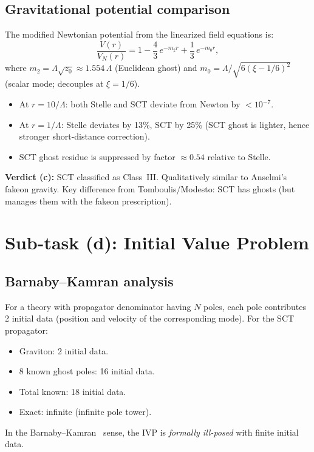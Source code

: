 \documentclass[11pt,a4paper]{article}
\newcommand{\Lam}{\Lambda}
\begin{document}
\subsection{Gravitational potential comparison}

The modified Newtonian potential from the linearized field equations is:
\begin{equation}\label{eq:potential}
  \frac{V(r)}{V_N(r)} = 1 - \frac{4}{3}\,e^{-m_2 r} + \frac{1}{3}\,e^{-m_0 r},
\end{equation}
where $m_2 = \Lam\sqrt{z_0} \approx 1.554\,\Lam$ (Euclidean ghost) and
$m_0 = \Lam/\sqrt{6(\xi-1/6)^2}$ (scalar mode; decouples at $\xi = 1/6$).

\begin{itemize}[nosep]
  \item At $r = 10/\Lam$: both Stelle and SCT deviate from Newton by $< 10^{-7}$.
  \item At $r = 1/\Lam$: Stelle deviates by 13\%, SCT by 25\%
    (SCT ghost is lighter, hence stronger short-distance correction).
  \item SCT ghost residue is suppressed by factor $\approx 0.54$ relative to Stelle.
\end{itemize}

\textbf{Verdict (c):} SCT classified as Class~III. Qualitatively similar to
Anselmi's fakeon gravity. Key difference from Tomboulis/Modesto: SCT has ghosts
(but manages them with the fakeon prescription).

\section{Sub-task (d): Initial Value Problem}
\label{sec:IVP}

\subsection{Barnaby--Kamran analysis}

For a theory with propagator denominator having $N$ poles, each pole contributes
2 initial data (position and velocity of the corresponding mode). For the SCT
propagator:
\begin{itemize}[nosep]
  \item Graviton: 2 initial data.
  \item 8 known ghost poles: 16 initial data.
  \item Total known: 18 initial data.
  \item Exact: infinite (infinite pole tower).
\end{itemize}
In the Barnaby--Kamran~\cite{BarnabyKamran2007} sense, the IVP is \emph{formally
ill-posed} with finite initial data.
\end{document}
